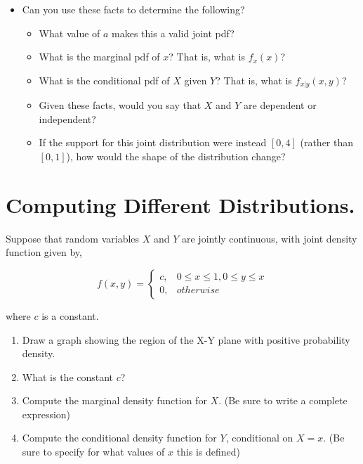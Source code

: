 \documentclass[
]{book}
\providecommand{\tightlist}{%
  \setlength{\itemsep}{0pt}\setlength{\parskip}{0pt}}
\theoremstyle{definition}
\theoremstyle{definition}
\theoremstyle{definition}
\theoremstyle{definition}
\theoremstyle{remark}
\begin{document}
\begin{itemize}
\tightlist
\item
  Can you use these facts to determine the following?

  \begin{itemize}
  \tightlist
  \item
    What value of \(a\) makes this a valid joint pdf?
  \item
    What is the marginal pdf of \(x\)? That is, what is \(f_{x}(x)\)?
  \item
    What is the conditional pdf of \(X\) given \(Y\)? That is, what is \(f_{x|y}(x,y)\)?
  \item
    Given these facts, would you say that \(X\) and \(Y\) are dependent or independent?
  \item
    If the support for this joint distribution were instead \([0,4]\) (rather than \([0,1]\)), how would the shape of the distribution change?
  \end{itemize}
\end{itemize}

\hypertarget{computing-different-distributions.}{%
\section{Computing Different Distributions.}\label{computing-different-distributions.}}

Suppose that random variables \(X\) and \(Y\) are jointly continuous, with joint density function given by,

\[
f(x,y) = 
  \begin{cases}
    c, & 0 \leq x \leq 1, 0 \leq y \leq x \\
    0, & otherwise
\end{cases}
\]

where \(c\) is a constant.

\begin{enumerate}
\def\labelenumi{\arabic{enumi}.}
\tightlist
\item
  Draw a graph showing the region of the X-Y plane with positive probability density.
\item
  What is the constant \(c\)?
\item
  Compute the marginal density function for \(X\). (Be sure to write a complete expression)
\item
  Compute the conditional density function for \(Y\), conditional on \(X=x\). (Be sure to specify for what values of \(x\) this is defined)
\end{enumerate}
\end{document}
